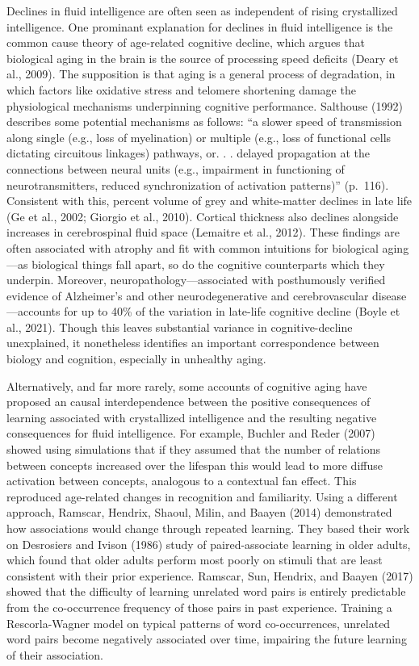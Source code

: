 \documentclass[
  man,floatsintext]{apa6}
\begin{document}
Declines in fluid intelligence are often seen as independent of rising crystallized intelligence. One prominant explanation for declines in fluid intelligence is the common cause theory of age-related cognitive decline, which argues that biological aging in the brain is the source of processing speed deficits (Deary et al., 2009). The supposition is that aging is a general process of degradation, in which factors like oxidative stress and telomere shortening damage the physiological mechanisms underpinning cognitive performance. Salthouse (1992) describes some potential mechanisms as follows: ``a slower speed of transmission along single (e.g., loss of myelination) or multiple (e.g., loss of functional cells dictating circuitous linkages) pathways, or. . . delayed propagation at the connections between neural units (e.g., impairment in functioning of neurotransmitters, reduced synchronization of activation patterns)'' (p.~116). Consistent with this, percent volume of grey and white-matter declines in late life (Ge et al., 2002; Giorgio et al., 2010). Cortical thickness also declines alongside increases in cerebrospinal fluid space (Lemaitre et al., 2012). These findings are often associated with atrophy and fit with common intuitions for biological aging---as biological things fall apart, so do the cognitive counterparts which they underpin. Moreover, neuropathology---associated with posthumously verified evidence of Alzheimer's and other neurodegenerative and cerebrovascular disease---accounts for up to 40\% of the variation in late-life cognitive decline (Boyle et al., 2021). Though this leaves substantial variance in cognitive-decline unexplained, it nonetheless identifies an important correspondence between biology and cognition, especially in unhealthy aging.

Alternatively, and far more rarely, some accounts of cognitive aging have proposed an causal interdependence between the positive consequences of learning associated with crystallized intelligence and the resulting negative consequences for fluid intelligence. For example, Buchler and Reder (2007) showed using simulations that if they assumed that the number of relations between concepts increased over the lifespan this would lead to more diffuse activation between concepts, analogous to a contextual fan effect. This reproduced age-related changes in recognition and familiarity. Using a different approach, Ramscar, Hendrix, Shaoul, Milin, and Baayen (2014) demonstrated how associations would change through repeated learning. They based their work on Desrosiers and Ivison (1986) study of paired-associate learning in older adults, which found that older adults perform most poorly on stimuli that are least consistent with their prior experience. Ramscar, Sun, Hendrix, and Baayen (2017) showed that the difficulty of learning unrelated word pairs is entirely predictable from the co-occurrence frequency of those pairs in past experience. Training a Rescorla-Wagner model on typical patterns of word co-occurrences, unrelated word pairs become negatively associated over time, impairing the future learning of their association.
\end{document}
